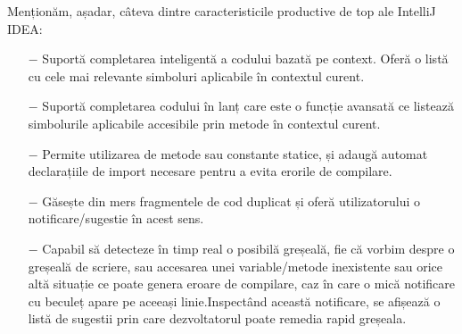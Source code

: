 Menționăm, așadar, câteva dintre caracteristicile productive de top ale IntelliJ IDEA:
\begin{itemize}
	\addtolength{\itemindent}{1cm}
	\item[$-$]Suportă completarea inteligentă a codului bazată pe context. Oferă o listă cu cele mai relevante simboluri aplicabile în contextul curent.
	\item[$-$]Suportă completarea codului în lanț care este o funcție avansată ce listează simbolurile aplicabile accesibile prin metode în contextul curent.
	\item[$-$]Permite utilizarea de metode sau constante statice, și adaugă automat declarațiile de import necesare pentru a evita erorile de compilare.
	\item[$-$]Găsește din mers fragmentele de cod duplicat și oferă utilizatorului o notificare/sugestie în acest sens.
	\item[$-$]Capabil să detecteze în timp real o posibilă greșeală, fie că vorbim despre o greșeală de scriere, sau accesarea unei variable/metode inexistente sau orice altă situație ce poate genera eroare de compilare, caz în care o mică notificare cu beculeț apare pe aceeași linie.\newline Inspectând această notificare, se afișează o listă de sugestii prin care dezvoltatorul poate remedia rapid greșeala.
	\newline
\end{itemize}

\label{chap:02}
